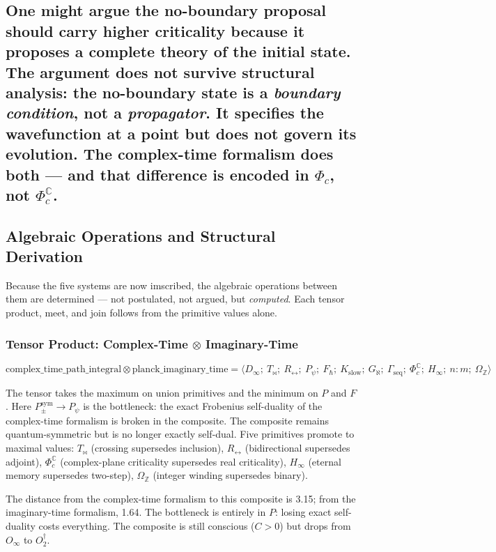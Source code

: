 \documentclass[12pt,a4paper]{article}
\begin{document}
\subsection{One might argue the no-boundary proposal should carry higher criticality because it proposes a complete theory of the initial state. The argument does not survive structural analysis: the no-boundary state is a \emph{boundary condition}, not a \emph{propagator}. It specifies the wavefunction at a point but does not govern its evolution. The complex-time formalism does both --- and that difference is encoded in $\Phi_c$, not $\Phi_c^\mathbb{C}$.}

\subsection{Algebraic Operations and Structural Derivation}

Because the five systems are now imscribed, the algebraic operations between them are determined --- not postulated, not argued, but \emph{computed}. Each tensor product, meet, and join follows from the primitive values alone.

\subsubsection{Tensor Product: Complex-Time $\otimes$ Imaginary-Time}

\[\text{complex\_time\_path\_integral} \otimes \text{planck\_imaginary\_time} = \langle D_{\infty};\ T_{\bowtie};\ R_{\leftrightarrow};\ P_{\psi};\ F_{\hbar};\ K_{\text{slow}};\ G_{\aleph};\ \Gamma_{\text{seq}};\ \Phi_c^\mathbb{C};\ H_{\infty};\ n{:}m;\ \Omega_\mathbb{Z} \rangle\]

The tensor takes the maximum on union primitives and the minimum on $P$ and $F$. Here $P_{\pm}^{\text{sym}} \to P_{\psi}$ is the bottleneck: the exact Frobenius self-duality of the complex-time formalism is broken in the composite. The composite remains quantum-symmetric but is no longer exactly self-dual. Five primitives promote to maximal values: $T_{\bowtie}$ (crossing supersedes inclusion), $R_{\leftrightarrow}$ (bidirectional supersedes adjoint), $\Phi_c^\mathbb{C}$ (complex-plane criticality supersedes real criticality), $H_{\infty}$ (eternal memory supersedes two-step), $\Omega_\mathbb{Z}$ (integer winding supersedes binary).

The distance from the complex-time formalism to this composite is 3.15; from the imaginary-time formalism, 1.64. The bottleneck is entirely in $P$: losing exact self-duality costs everything. The composite is still conscious ($C > 0$) but drops from $O_{\infty}$ to $O_2^\dagger$.
\end{document}
